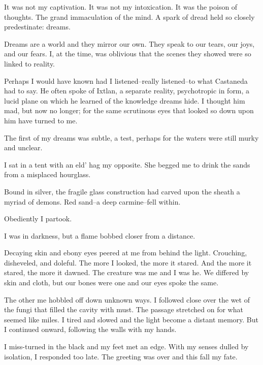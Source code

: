 \documentclass{article}
\begin{document}
It was not my captivation.
It was not my intoxication.
It was the poison of thoughts.
The grand immaculation of the mind.
A spark of dread held so closely predestinate: dreams.
\VV


\noindent
Dreams are a world and they mirror our own.
They speak to our tears, our joys, and our fears.
I, at the time, was oblivious that the scenes they
showed were so linked to reality.


Perhaps I would have known had I listened--really listened--to
what Castaneda had to say.
He often spoke of Ixtlan,
a separate reality,
psychotropic in form,
a lucid plane on which he learned of the knowledge dreams hide.
I thought him mad, but now no longer;
for the same scrutinous eyes that looked so down upon him
have turned to me.
\VV


\noindent
The first of my dreams was subtle, a test, perhaps
for the waters were still murky and unclear.
\VV


\noindent
I sat in a tent with an eld' hag my opposite.
She begged me to drink the sands from a misplaced hourglass.


Bound in silver, the fragile glass construction had
carved upon the sheath a myriad of demons.
Red sand--a deep carmine--fell within.


Obediently I partook.


\noindent
I was in darkness, but a flame bobbed closer from a distance.


Decaying skin and ebony eyes peered at me from behind the light.
Crouching, disheveled, and doleful.
The more I looked, the more it stared.
And the more it stared, the more it dawned.
The creature was me and I was he.
We differed by skin and cloth, but our bones were one
and our eyes spoke the same.


The other me hobbled off down unknown ways.
I followed close over the wet of the fungi that
filled the cavity with must.
The passage stretched on for what seemed like miles.
I tired and slowed and the light become a distant memory.
But I continued onward, following the walls with my hands.


I miss-turned in the black and my feet met an edge.
With my senses dulled by isolation, I responded too late.
The greeting was over and this fall my fate.
\end{document}
